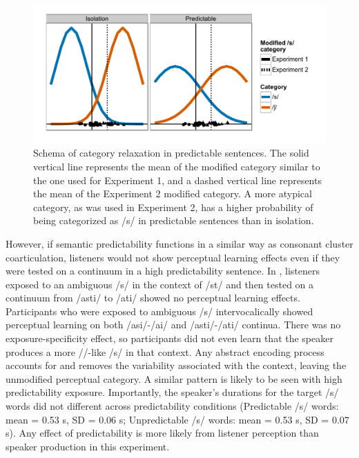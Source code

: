 \begin{figure}[!ht]
\centering
\caption{Schema of category relaxation in predictable sentences.  The solid vertical line represents the mean of the modified category similar to the one used for Experiment 1, and a dashed vertical line represents the mean of the Experiment 2 modified category.  A more atypical category, as was used in Experiment 2, has a higher probability of being categorized as /s/ in predictable sentences than in isolation.}
\label{fig:distPred}
\begin{center}
\includegraphics[width=\textwidth]{graphs/distPred}
\end{center}
\end{figure}

However, if semantic predictability functions in a similar way as consonant cluster coarticulation, listeners would not show perceptual learning effects even if they were tested on a continuum in a high predictability sentence.
In \citet{Kraljic2008a}, listeners exposed to an ambiguous /s/ in the context of /st\textturnr/ and then tested on a continuum from /ast\textturnr i/ to /a\textesh t\textturnr i/ showed no perceptual learning effects.
Participants who were exposed to ambiguous /s/ intervocalically showed perceptual learning on both /asi/-/a\textesh i/ and /ast\textturnr i/-/a\textesh t\textturnr i/ continua.
There was no exposure-specificity effect, so participants did not even learn that the speaker produces a more /\textesh/-like /s/ in that context.
Any abstract encoding process accounts for and removes the variability associated with the context, leaving the unmodified perceptual category.
A similar pattern is likely to be seen with high predictability exposure.
Importantly, the speaker's durations for the target /s/ words did not different across predictability conditions (Predictable /s/ words: mean = 0.53 s, SD = 0.06 s; Unpredictable /s/ words: mean = 0.53 s, SD = 0.07 s).
Any effect of predictability is more likely from listener perception than speaker production in this experiment.

